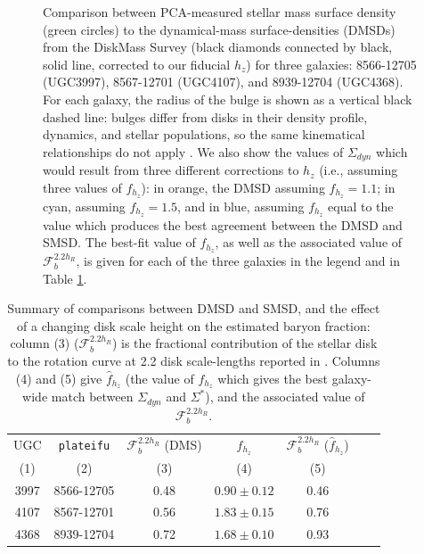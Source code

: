 \begin{figure}
    \caption[Comparison between PCA-measured stellar mass surface density and DiskMass measured dynamical mass surface densities]{\fixspacing Comparison between PCA-measured stellar mass surface density (green circles) to the dynamical-mass surface-densities (DMSDs) from the DiskMass Survey (black diamonds connected by black, solid line, corrected to our fiducial $h_z$) for three galaxies: 8566-12705 (UGC3997), 8567-12701 (UGC4107), and 8939-12704 (UGC4368). For each galaxy, the radius of the bulge is shown as a vertical black dashed line: bulges differ from disks in their density profile, dynamics, and stellar populations, so the same kinematical relationships do not apply \citep{diskmass_vii}. We also show the values of $\Sigma_{dyn}$ which would result from three different corrections to $h_z$ (i.e., assuming three values of $f_{h_z}$): in orange, the DMSD assuming $f_{h_z} = 1.1$; in cyan, assuming $f_{h_z} = 1.5$, and in blue, assuming $f_{h_z}$ equal to the value which produces the best agreement between the DMSD  and SMSD. The best-fit value of $f_{h_z}$, as well as the associated value of $\mathcal{F}_b^{2.2h_R}$, is given for each of the three galaxies in the legend and in Table \ref{tab:diskmass_galaxy_data}.}
    \label{fig:dms_compare}
\end{figure}

\begin{table}
    \centering
    \begin{tabular}{||c|c||c|c|c|c|c||} \hline
        UGC & \texttt{plateifu} & $\mathcal{F}_b^{2.2h_R}$ (DMS) & $\hat{f}_{h_z}$ & $\mathcal{F}_b^{2.2h_R}$ ($\hat{f}_{h_z}$) \\
        (1) & (2) & (3) & (4) & (5) \\ \hline
        3997 & 8566-12705 & 0.48 & $0.90 \pm 0.12$ & 0.46 \\ \hline
        4107 & 8567-12701 & 0.56 & $1.83 \pm 0.15$ & 0.76 \\ \hline
        4368 & 8939-12704 & 0.72 & $1.68 \pm 0.10$ & 0.93 \\ \hline
    \end{tabular}
    \caption[The effects of disk scale height assumptions]{Summary of comparisons between DMSD and SMSD, and the effect of a changing disk scale height on the estimated baryon fraction: column (3) ($\mathcal{F}_b^{2.2h_R}$) is the fractional contribution of the stellar disk to the rotation curve at 2.2 disk scale-lengths reported in \citet{diskmass_vii}. Columns (4) and (5) give $\hat{f}_{h_z}$ (the value of $f_{h_z}$ which gives the best galaxy-wide match between $\Sigma_{dyn}$ and $\Sigma^*$), and the associated value of $\mathcal{F}_b^{2.2h_R}$.}
    \label{tab:diskmass_galaxy_data}
\end{table}

